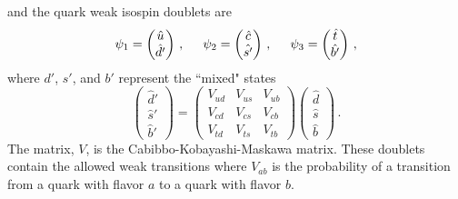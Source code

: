  and the quark weak isospin doublets are
  \begin{equation}
    \psi_{1} = 
    \begin{pmatrix}
        \hat{u} \\
        \hat{d'}
    \end{pmatrix} \,,
      \hspace{5mm}
    \psi_{2} = 
    \begin{pmatrix}
        \hat{c} \\
        \hat{s'}
    \end{pmatrix} \,,
      \hspace{5mm}
    \psi_{3} = 
    \begin{pmatrix}
        \hat{t} \\
        \hat{b'}
    \end{pmatrix} \,,
  \end{equation}
  where $d'$, $s'$, and $b'$ represent the ``mixed" states
  \begin{equation}
      \begin{pmatrix}
        \hat{d}' \\
        \hat{s}' \\
        \hat{b}'
      \end{pmatrix}
      =
      \begin{pmatrix}
          V_{ud} & V_{us} & V_{ub} \\
          V_{cd} & V_{cs} & V_{cb} \\
          V_{td} & V_{ts} & V_{tb}
      \end{pmatrix}
      \begin{pmatrix}
        \hat{d} \\
        \hat{s} \\
        \hat{b}
      \end{pmatrix} \,.
  \end{equation}
  The matrix, $V$, is the Cabibbo-Kobayashi-Maskawa matrix. These doublets
  contain the allowed weak transitions where $V_{ab}$ is the probability of a
  transition from a quark with flavor $a$ to a quark with flavor $b$.

